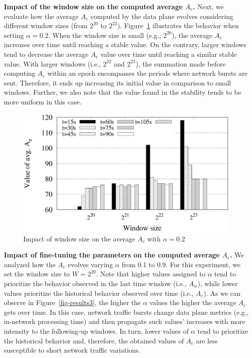\noindent \textbf{Impact of the window size on the computed average $A_e$.} Next, we evaluate how the average $A_e$ computed by the data plane evolves considering different window sizes (from $2^{20}$ to $2^{23}$). Figure~\ref{fig-result2} illustrates the behavior when setting $\alpha = 0.2$. When the window size is small (e.g., $2^{20}$), the average $A_e$ increases over time until reaching a stable value. On the contrary, larger windows tend to decrease the average $A_e$ value over time until reaching a similar stable value. With larger windows (i.e., $2^{22}$ and $2^{23}$), the summation made before computing $A_e$ within an epoch encompasses the periods where network bursts are sent. Therefore, it ends up increasing its initial value in comparison to small windows. Further, we also note that the value found in the stability tends to be more uniform in this case.\\ %

\begin{figure}[!t]
\centering
            \includegraphics[scale=0.35]{results/g4b.eps}
    
\caption{Impact of window size on the average $A_e$ with $\alpha = 0.2$}
  \label{fig-result2}
\end{figure}

\noindent \textbf{Impact of fine-tuning the parameters on the computed average $A_e$.} We analyzed how the $A_e$ evolves varying $\alpha$ from 0.1 to 0.9. For this experiment, we set the window size to $W = 2^{20}$. Note that higher values assigned to $\alpha$ tend to prioritize the behavior observed in the last time window (i.e., $A_w$), while lower values prioritize the historical behavior observed over time (i.e., $A_e$). As we can observe in Figure~\ref{fig-results3}, the higher the $\alpha$ values the higher the average $A_e$ gets over time. In this case, network traffic bursts change data plane metrics (e.g., in-network processing time) and then propagate such values' increases with more intensity to the following-up windows. In turn, lower values of $\alpha$ tend to prioritize the historical behavior and, therefore, the obtained values of $A_e$ are less susceptible to short network traffic variations.\\

